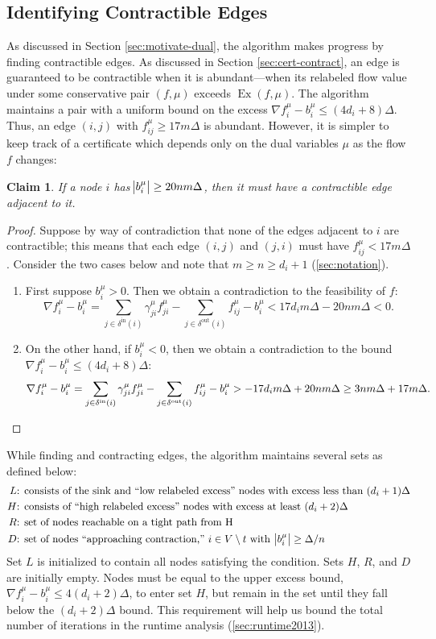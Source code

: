 \documentclass[11pt]{article}
\newtheorem{claim}[theorem]{Claim}
\theoremstyle{definition}
\theoremstyle{definition}
\theoremstyle{definition}
\newcommand{\fu}{f^{\mu}}
\newcommand{\nfiu}{\nabla \fu_i}
\newcommand{\biu}{b_{i}^{\mu}}
\newcommand{\din}{\delta^{\text{in}}}
\newcommand{\dout}{\delta^{\text{out}}}
\DeclareMathOperator{\Ex}{Ex}
\begin{document}
\subsection{Identifying Contractible Edges}
\label{sec:findcontr2013}
As discussed in Section \ref{sec:motivate-dual},
the algorithm makes progress by finding contractible edges.
As discussed in Section \ref{sec:cert-contract}, an edge is guaranteed
to be contractible when it is abundant---when its relabeled flow value
under some conservative pair $(f, \mu)$
exceeds $\Ex(f, \mu)$. The algorithm maintains a pair with
a uniform bound on the excess $\nfiu - \biu \leq (4d_i + 8)\Delta$.
Thus, an edge $(i, j)$ with $f_{ij}^\mu \geq 17m\Delta$ is abundant.
However, it is simpler to keep track of a certificate which depends only
on the dual variables $\mu$ as the flow $f$ changes:
\begin{claim}
If a node $i$ has $\abs{b_i^\mu} \geq 20nm\Delta$, then it must
have a contractible edge adjacent to it.
\end{claim}
\begin{proof}
Suppose by way of contradiction that none of the edges adjacent to $i$ are
contractible; this means that each edge $(i,j)$ and $(j,i)$ must have $f_{ij}^\mu < 17m\Delta$.
Consider the two cases below and note that $m \geq n \geq d_i + 1$ (\ref{sec:notation}).
\begin{enumerate}[itemsep=0mm]
\item First suppose $b_i^\mu > 0$. Then we obtain a contradiction to the feasibility of $f$:
      \[ \nfiu - \biu = \sum_{j \in \din(i)} \gamma_{ji}^\mu f_{ji}^\mu -
	  \sum_{j \in \dout(i)} f_{ij}^\mu - b_i^\mu < 17d_im\Delta - 20nm\Delta < 0. \]
\item On the other hand, if $b_i^\mu < 0$, then we obtain a contradiction to the
      bound $\nfiu - \biu \leq (4d_i + 8)\Delta$:
	  \[ \nfiu - \biu = \sum_{j \in \din(i)} \gamma_{ji}^\mu f_{ji}^\mu -
		 \sum_{j \in \dout(i)} f_{ij}^\mu - b_i^\mu
         > -17d_im\Delta + 20nm\Delta \geq 3nm\Delta + 17m\Delta. \qedhere \]
\end{enumerate}
\end{proof}
While finding and contracting edges, the algorithm maintains several sets as defined below:
	\begin{align*}
	L&\text{: consists of the sink and ``low relabeled excess'' nodes with excess less than } (d_i +1)\Delta \\
	H&\text{: consists of ``high relabeled excess'' nodes with  excess at least } (d_i + 2)\Delta \\
	R&\text{: set of nodes reachable on a tight path from H } \\ 
	D&\text{: set of nodes ``approaching contraction,'' $i \in V \setminus t$ with } \abs{b_i^\mu} \geq \Delta / n
	\end{align*}
Set $L$ is initialized to contain all nodes satisfying the condition. Sets $H$,
$R$, and $D$ are initially empty. Nodes must be equal to the upper excess bound, 
$\nfiu - \biu \leq 4(d_i + 2)\Delta$, to enter set $H$, but remain in the set until they
fall below the $(d_i + 2)\Delta$ bound. This requirement will help us bound the total number of iterations in the runtime analysis (\ref{sec:runtime2013}).
\end{document}
